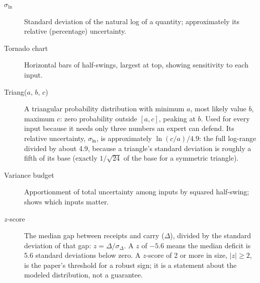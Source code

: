 \documentclass[11pt,letterpaper]{article}
\begin{document}
\begin{description}
\item[$\sigma_{\ln}$] Standard deviation of the natural log of a quantity; approximately its relative (percentage) uncertainty.
\item[Tornado chart] Horizontal bars of half-swings, largest at top, showing sensitivity to each input.
\item[Triang($a$, $b$, $c$)] A triangular probability distribution with minimum $a$, most likely value $b$, maximum $c$: zero probability outside $[a,c]$, peaking at $b$. Used for every input because it needs only three numbers an expert can defend. Its relative uncertainty, $\sigma_{\ln}$, is approximately $\ln(c/a)/4.9$: the full log-range divided by about 4.9, because a triangle's standard deviation is roughly a fifth of its base (exactly $1/\sqrt{24}$ of the base for a symmetric triangle).
\item[Variance budget] Apportionment of total uncertainty among inputs by squared half-swing; shows which inputs matter.
\item[$z$-score] The median gap between receipts and carry ($\Delta$), divided by the standard deviation of that gap: $z=\Delta/\sigma_\Delta$. A $z$ of $-5.6$ means the median deficit is 5.6 standard deviations below zero. A $z$-score of 2 or more in size, $|z|\ge2$, is the paper's threshold for a robust sign; it is a statement about the modeled distribution, not a guarantee.
\end{description}
\end{document}
